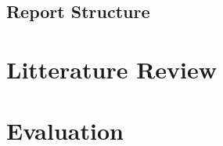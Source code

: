 \documentclass[a4paper]{memoir}
\begin{document}
\section{Report Structure}

\chapter{Litterature Review}

\chapter{Evaluation}
\end{document}
